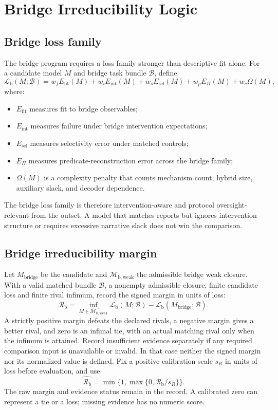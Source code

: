 \documentclass[11pt,a4paper]{article}
\theoremstyle{definition}
\newcommand{\BridgeWeakFam}{\mathcal{M}_{\mathrm{b,weak}}}
\newcommand{\BridgeWeakClosure}{\overline{\BridgeWeakFam}}
\newcommand{\BridgeLoss}{\mathcal{L}_{\mathrm{b}}}
\newcommand{\BridgeMargin}{\mathcal{R}_{\mathrm{b}}}
\begin{document}
\section{Bridge Irreducibility Logic}
\subsection{Bridge loss family}
The bridge program requires a loss family stronger than descriptive fit alone. For a candidate model $M$ and bridge task bundle $\mathcal{B}$, define
\[
\BridgeLoss(M;\mathcal{B})=
w_f E_{\mathrm{fit}}(M)
+w_i E_{\mathrm{int}}(M)
+w_s E_{\mathrm{sel}}(M)
+w_p E_{\Pi}(M)
+w_c \Omega(M),
\]
where:
\begin{itemize}[leftmargin=1.5em]
\item $E_{\mathrm{fit}}$ measures fit to bridge observables;
\item $E_{\mathrm{int}}$ measures failure under bridge intervention expectations;
\item $E_{\mathrm{sel}}$ measures selectivity error under matched controls;
\item $E_{\Pi}$ measures predicate-reconstruction error across the bridge family;
\item $\Omega(M)$ is a complexity penalty that counts mechanism count, hybrid size, auxiliary slack, and decoder dependence.
\end{itemize}
The bridge loss family is therefore intervention-aware and protocol oversight-relevant from the outset. A model that matches reports but ignores intervention structure or requires excessive narrative slack does not win the comparison.

\subsection{Bridge irreducibility margin}
Let $M_{\mathrm{bridge}}$ be the candidate and $\BridgeWeakClosure$ the admissible bridge weak closure. With a valid matched bundle $\mathcal B$, a nonempty admissible closure, finite candidate loss and finite rival infimum, record the signed margin in units of loss:
\[
\BridgeMargin=\inf_{M\in\BridgeWeakClosure}\BridgeLoss(M;\mathcal B)
-\BridgeLoss(M_{\mathrm{bridge}};\mathcal B).
\]
A strictly positive margin defeats the declared rivals, a negative margin gives a better rival, and zero is an infimal tie, with an actual matching rival only when the infimum is attained. Record insufficient evidence separately if any required comparison input is unavailable or invalid. In that case neither the signed margin nor its normalized value is defined. Fix a positive calibration scale $s_R$ in units of loss before evaluation, and use
\[
 \widehat{\BridgeMargin}=\min\{1,\max\{0,\BridgeMargin/s_R\}\}.
\]
The raw margin and evidence status remain in the record. A calibrated zero can represent a tie or a loss; missing evidence has no numeric score.
\end{document}
